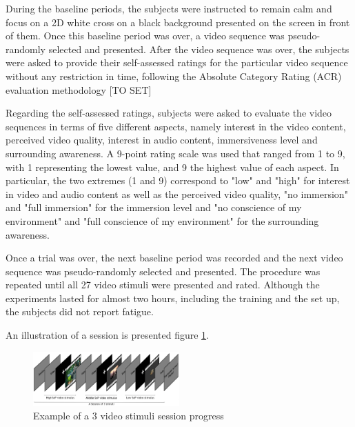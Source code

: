 During the baseline periods, the subjects were instructed to remain calm and focus on a 2D white cross on a black background presented on the screen in front of them. Once this baseline period was over, a video sequence was pseudo-randomly selected and presented.
After the video sequence was over, the subjects were asked to provide their self-assessed ratings for the particular video sequence without any restriction in time, following the Absolute Category Rating (ACR) evaluation methodology [TO SET]

Regarding the self-assessed ratings, subjects were asked to evaluate the video sequences in terms of five different aspects, namely interest in the video content, perceived video quality, interest in audio content, immersiveness level and surrounding awareness. A 9-point rating scale was used that ranged from 1 to 9, with 1 representing the lowest value, and 9 the highest value of each aspect. In particular, the two extremes (1 and 9) correspond to "low" and "high" for interest in video and audio content as well as the perceived video quality, "no immersion" and "full immersion" for the immersion level and "no conscience of my environment" and "full conscience of my environment" for the surrounding awareness.

Once a trial was over, the next baseline period was recorded and the next video sequence was pseudo-randomly selected and presented. The procedure was repeated until all 27 video stimuli were presented and rated. Although the experiments lasted for almost two hours, including the training and the set up, the subjects did not report fatigue.

An illustration of a session is presented figure \ref{session}.

\begin{figure}[!ht]
    \center
    \includegraphics[width=0.5\textwidth]{./images/ExSession_.png}
    \caption{Example of a 3 video stimuli session progress }
    \label{session}
\end{figure}









